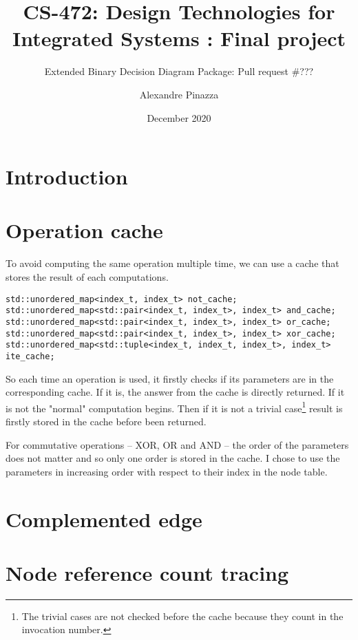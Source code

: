 \documentclass[nonacm=true]{acmart}
\title{CS-472: Design Technologies for Integrated Systems : Final project}
\subtitle{Extended Binary Decision Diagram Package: Pull request \#???}
\author{Alexandre Pinazza}
\affiliation{
    \institution{IC, EPFL}
    \state{Vaud}
    \city{Lausanne}
    \country{Switzerland}
}
\date{December 2020}
\begin{document}
\maketitle
{}

\section{Introduction}

\section{Operation cache}
To avoid computing the same operation multiple time, we can use a cache that stores the result of each computations.

\begin{verbatim}
std::unordered_map<index_t, index_t> not_cache;
std::unordered_map<std::pair<index_t, index_t>, index_t> and_cache;
std::unordered_map<std::pair<index_t, index_t>, index_t> or_cache;
std::unordered_map<std::pair<index_t, index_t>, index_t> xor_cache;
std::unordered_map<std::tuple<index_t, index_t, index_t>, index_t> ite_cache;
\end{verbatim}

So each time an operation is used, it firstly checks if its parameters are in the corresponding cache. If it is, the answer from the cache is directly returned. If it is not the "normal" computation begins. Then if it is not a trivial case\footnote{The trivial cases are not checked before the cache because they count in the invocation number.} result is firstly stored in the cache before been returned.

For commutative operations -- XOR, OR and AND -- the order of the parameters does not matter and so only one order is stored in the cache. I chose to use the parameters in increasing order with respect to their index in the node table. 

\section{Complemented edge}

\section{Node reference count tracing}

\listoftodos{}
\end{document}
